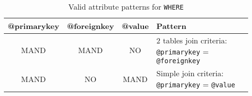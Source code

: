 \begin{table}[!htbp]
\small
\centering
\begin{tabulary}{\linewidth}{|c|c|c|J|}
    \hline 
        \textbf{@primarykey} &
        \textbf{@foreignkey} &
        \textbf{@value} &
        \textbf{Pattern}\\
    \hline      \hline  
        MAND &           
        MAND &           
        NO &           
        2 tables join criteria: \texttt{@primarykey} = \texttt{@foreignkey} \\
    \hline     
        MAND &           
        NO &           
        MAND &           
        Simple join criteria: \texttt{@primarykey} = \texttt{@value} \\
   \hline 
\end{tabulary}
     \caption{Valid attribute patterns for  \texttt{WHERE}}
     \label{tbl:where-pattern}
\end{table}
